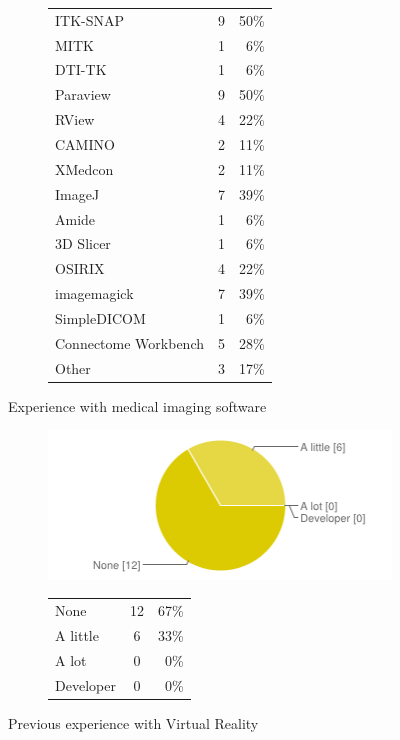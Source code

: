 \documentclass[MSc,paper=a4,pagesize=auto]{icldt}
\begin{document}
\begin{figure}[htbp!]
\begin{subfigure}{0.5\textwidth}
\begin{tabular}{ l c r }
	ITK-SNAP				&9&50\% \\
	MITK					&1&6\% \\
	DTI-TK				&1&6\% \\
	Paraview				&9&50\% \\
	RView				&4&22\% \\
	CAMINO				&2&11\% \\
	XMedcon				&2&11\% \\
	ImageJ				&7&39\% \\
	Amide				&1&6\% \\
	3D Slicer			&1&6\% \\
	OSIRIX				&4&22\% \\
	imagemagick			&7&39\% \\
	SimpleDICOM			&1&6\% \\
	Connectome Workbench	&5&28\% \\
	Other				&3&17\% \\
\end{tabular}
\end{subfigure} 
    \caption{Experience with medical imaging software}
    \label{fig:3-medical_imaging_packages}
\end{figure}
\clearpage
\begin{figure}[htbp!]
\centering
\begin{subfigure}{0.4\textwidth}
    \centering
    \includegraphics[width=1\linewidth]{resources/4-vr_experience}
\end{subfigure}%
\centering
\begin{subfigure}{0.5\textwidth}
    \centering
   	\begin{tabular}{ l c r }
None&12&67\% \\
A little&6&33\% \\
A lot&0&0\% \\
Developer&0&0\% \\
\end{tabular}
\end{subfigure} 
    \caption{Previous experience with Virtual Reality}
    \label{fig:4-vr_experience}
\end{figure}
\end{document}
